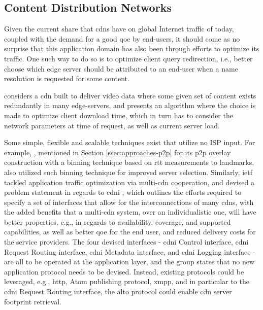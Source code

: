 \subsection{Content Distribution Networks}

\label{ssec:cdns}

    Given the current share that \glspl{cdn} have on global Internet traffic of today, coupled with the demand for a good \gls{qoe} by end-users, it should come as no surprise that this application domain has also been through efforts to optimize its traffic.
    One such way to do so is to optimize client query redirection, i.e., better choose which edge server should be attributed to an end-user when a name resolution is requested for some content.

    \cite{gromov2014} considers a \gls{cdn} built to deliver video data where some given set of content exists redundantly in many edge-servers, and presents an algorithm where the choice is made to optimize client download time, which in turn has to consider the network parameters at time of request, as well as current server load.

    Some simple, flexible and scalable techniques exist that utilize no ISP input.
    For example, \cite{topology-aware-p2p-server-selection}, mentioned in Section \ref{ssec:approaches-p2p} for its \gls{p2p} overlay construction with a binning technique based on \gls{rtt} measurements to landmarks, also utilized such binning technique for improved server selection.
    Similarly, \gls{ietf} tackled application traffic optimization via multi-\gls{cdn} cooperation, and devised a problem statement in regards to \gls{cdni} \cite{cdni-problem-statement}, which outlines the efforts required to specify a set of interfaces that allow for the interconnections of many \glspl{cdn}, with the added benefits that a multi-\gls{cdn} system, over an individualistic one, will have better properties, e.g., in regards to availability, coverage, and supported capabilities, as well as better \gls{qoe} for the end user, and reduced delivery costs for the service providers.
    The four devised interfaces - \gls{cdni} Control interface, \gls{cdni} Request Routing interface, \gls{cdni} Metadata interface, and \gls{cdni} Logging interface - are all to be operated at the application layer, and the group states that no new application protocol needs to be devised.
    Instead, existing protocols could be leveraged, e.g., \gls{http}, Atom publishing protocol, \gls{xmpp}, and in particular to the \gls{cdni} Request Routing interface, the \gls{alto} protocol could enable \gls{cdn} server footprint retrieval.

